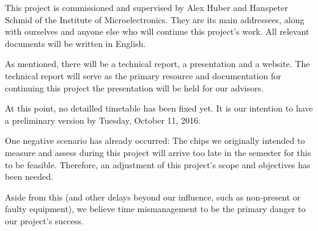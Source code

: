 \documentclass[a4paper,10pt]{article}
\begin{document}
\begin{description}[align=left]
        This  project  is  commissioned  and  supervised  by  Alex  Huber  and
        Hanspeter Schmid  of the  Institute of Microelectronics. They  are its
        main  addressees,  along  with  ourselves and  anyone  else  who  will
        continue this project's work.  All  relevant documents will be written
        in English.
    \item[Preliminary Structuring:]
        As mentioned, there  will be a technical report, a  presentation and a
        website. The technical report  will serve as the  primary resource and
        documentation  for continuing  this project  the presentation  will be
        held for our advisors.
    \item[Timetable:]
        At this  point, no detailled timetable  has been fixed yet. It  is our
        intention to have a preliminary version by Tuesday, October 11, 2016.
    \item[Risk Assessment:]
        One negative  scenario has  already occurred: The chips  we originally
        intended to  measure and  assess during this  project will  arrive too
        late in the semester for this to be feasible. Therefore, an adjustment
        of this project's scope and objectives has been needed.

        Aside  from this  (and  other  delays beyond  our  influence, such  as
        non-present or faulty equipment), we  believe time mismanagement to be
        the primary danger to our project's success.
\end{description}

%
%
%
\end{document}

